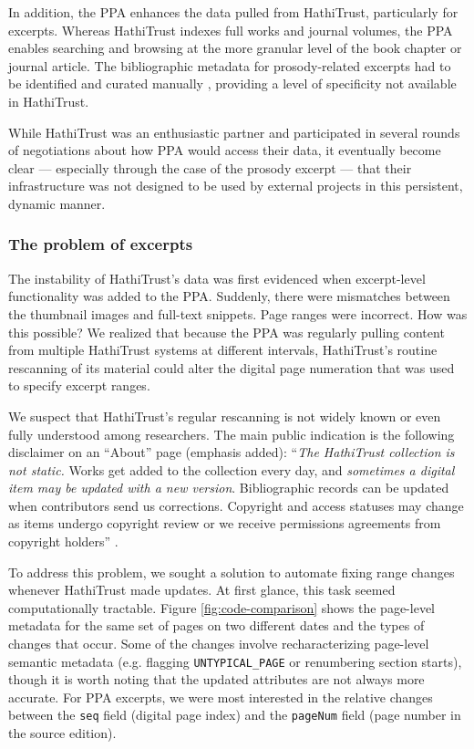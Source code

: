 \documentclass[final]{anthology-ch} %
\begin{document}
In addition, the PPA enhances the data pulled from HathiTrust, particularly for excerpts. Whereas HathiTrust indexes full works and journal volumes, the PPA enables searching and browsing at the more granular level of the book chapter or journal article. The bibliographic metadata for prosody-related excerpts had to be identified and curated manually \cite{naydan_book_2024}, providing a level of specificity not available in HathiTrust.

While HathiTrust was an enthusiastic partner and participated in several rounds of negotiations about how PPA would access their data, it eventually become clear — especially through the case of the prosody excerpt — that their infrastructure was not designed to be used by external projects in this persistent, dynamic manner. 

\subsubsection{The problem of excerpts}

The instability of HathiTrust's data was first evidenced when excerpt-level functionality was added to the PPA. Suddenly, there were mismatches between the thumbnail images and full-text snippets. Page ranges were incorrect. How was this possible? We realized that because the PPA was regularly pulling content from multiple HathiTrust systems at different intervals, HathiTrust's routine rescanning of its material could alter the digital page numeration that was used to specify excerpt ranges.

We suspect that HathiTrust's regular rescanning is not widely known or even fully understood among researchers. The main public indication is the following disclaimer on an ``About'' page (emphasis added): ``\textit{The HathiTrust collection is not static.} Works get added to the collection every day, and \textit{sometimes a digital item may be updated with a new version}. Bibliographic records can be updated when contributors send us corrections. Copyright and access statuses may change as items undergo copyright review or we receive permissions agreements from copyright holders'' \cite{noauthor_how_nodate}. 

To address this problem, we sought a solution to automate fixing range changes whenever HathiTrust made updates. At first glance, this task seemed computationally tractable. Figure  \ref{fig:code-comparison} shows the page-level metadata for the same set of pages on two different dates and the types of changes that occur. Some of the changes involve recharacterizing page-level semantic metadata (e.g. flagging \texttt{UNTYPICAL\_PAGE} or renumbering section starts), though it is worth noting that the updated attributes are not always more accurate. For PPA excerpts, we were most interested in the relative changes between the \texttt{seq} field (digital page index) and the \texttt{pageNum} field (page number in the source edition).
\end{document}
